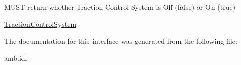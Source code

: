 M\-U\-S\-T return whether Traction Control System is Off (false) or On (true) 

\hyperlink{interfaceVehicle_1_1TractionControlSystem}{Traction\-Control\-System} 

The documentation for this interface was generated from the following file\-:\begin{DoxyCompactItemize}
\item 
amb.\-idl\end{DoxyCompactItemize}
